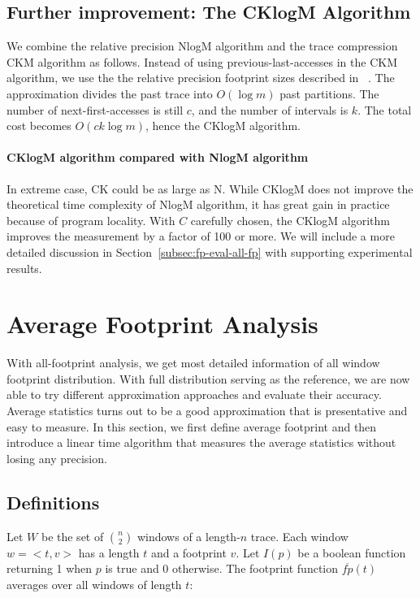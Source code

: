 \subsection{Further improvement: The CKlogM Algorithm}

We combine the relative precision NlogM algorithm and the trace
compression CKM algorithm as follows.  Instead of using
previous-last-accesses in the CKM algorithm, we use the the relative
precision footprint sizes described in ~\cite{DingC:PPOPP08}.
The approximation divides the past
trace into $O(\log m)$ past partitions.  The number of
next-first-accesses is still $c$, and the number of intervals is $k$.
The total cost becomes $O(ck\log m)$, hence the CKlogM algorithm.

\paragraph{CKlogM algorithm compared with NlogM algorithm} In extreme
case, CK could be as large as N. While CKlogM does not improve the
theoretical time complexity of NlogM algorithm, it has great gain in
practice because of program locality. With $C$ carefully chosen, the
CKlogM algorithm improves the measurement by a factor of 100 or
more. We will include a more detailed discussion in
Section~\ref{subsec:fp-eval-all-fp} with supporting experimental results.

\section{Average Footprint Analysis}
\label{sec:avg-fp}

With all-footprint analysis, we get most detailed information of all window
footprint distribution. With full distribution serving as the
reference, we are now able to try different approximation approaches
and evaluate their accuracy. Average statistics turns out to be a good
approximation that is presentative and easy to
measure. In this section, we first define average footprint and
then introduce a linear time algorithm that measures the average
statistics without losing any precision.

\subsection{Definitions}

Let $W$ be the set of ${{n}\choose{2}}$ windows of a length-$n$ trace.
Each window $w = <t, v>$ has a length $t$ and a footprint $v$.  Let
$I(p)$ be a boolean function returning 1 when $p$ is true and 0
otherwise.  The footprint function $\overline{fp}(t)$ averages over
all windows of length $t$:

